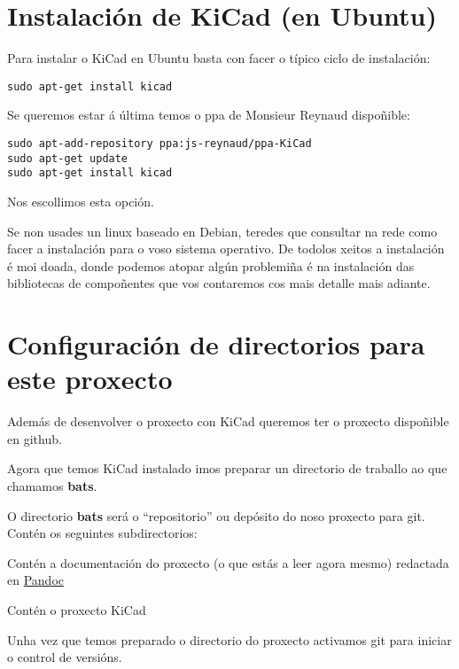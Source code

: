 \section{Instalación de KiCad (en
Ubuntu)}\label{instalaciuxf3n-de-kicad-en-ubuntu}

Para instalar o KiCad en Ubuntu basta con facer o típico ciclo de
instalación:

\begin{verbatim}
sudo apt-get install kicad
\end{verbatim}

Se queremos estar á última temos o ppa de Monsieur Reynaud dispoñible:

\begin{verbatim}
sudo apt-add-repository ppa:js-reynaud/ppa-KiCad
sudo apt-get update
sudo apt-get install kicad
\end{verbatim}

Nos escollimos esta opción.

Se non usades un linux baseado en Debian, teredes que consultar na rede
como facer a instalación para o voso sistema operativo. De todolos
xeitos a instalación é moi doada, donde podemos atopar algún problemiña
é na instalación das bibliotecas de compoñentes que vos contaremos cos
mais detalle mais adiante.

\section{Configuración de directorios para este
proxecto}\label{configuraciuxf3n-de-directorios-para-este-proxecto}

Además de desenvolver o proxecto con KiCad queremos ter o proxecto
dispoñible en github.

Agora que temos KiCad instalado imos preparar un directorio de traballo
ao que chamamos \textbf{bats}.

O directorio \textbf{bats} será o ``repositorio'' ou depósito do noso
proxecto para git. Contén os seguintes subdirectorios:

\begin{description}
\itemsep1pt\parskip0pt
\item[doc]
Contén a documentación do proxecto (o que estás a leer agora mesmo)
redactada en \href{http://pandoc.org/}{Pandoc}
\item[kicad]
Contén o proxecto KiCad
\end{description}

Unha vez que temos preparado o directorio do proxecto activamos git para
iniciar o control de versións.

